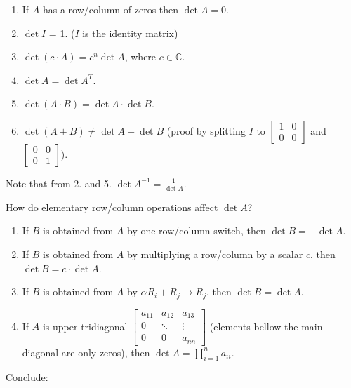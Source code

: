 \documentclass{article}
\newcommand{\nocomma}{}
\begin{document}
\begin{enumerate}
  \item If $A$ has a row/column of zeros then $\det A = 0$.
  
  \item $\det I$ = 1. ($I$ is the identity matrix)
  
  \item $\det (c \cdot A) = c^n \det A$, where $c \in \mathbb{C}$.
  
  \item $\det A = \det A^T$.
  
  \item $\det (A \cdot B) = \det A \cdot \det B$.
  
  \item $\det (A + B) \neq \det A + \det B$ (proof by splitting $I$ to
  $\left[\begin{array}{cc}
    1 & 0\\
    0 & 0
  \end{array}\right]$ and $\left[\begin{array}{cc}
    0 & 0\\
    0 & 1
  \end{array}\right]$).
\end{enumerate}
Note that from 2. and 5. $\det A^{- 1} = \frac{1}{\det A}$.

How do elementary row/column operations affect $\det A$?
\begin{enumerate}
  \item If $B$ is obtained from $A$ by one row/column switch, then $\det B = -
  \det A$.
  
  \item If $B$ is obtained from $A$ by multiplying a row/column by a scalar
  $c$, then $\det B = c \cdot \det A$.
  
  \item If $B$ is obtained from $A$ by $\alpha R_i + R_j \rightarrow R_j$,
  then $\det B = \det A$.
  
  \item If $A$ is upper-tridiagonal $\left[\begin{array}{ccc}
    a_{11} & a_{12} & a_{13}\\
    0 & \ddots & \vdots\\
    0 & 0 & a_{n \nocomma n}
  \end{array}\right]$ (elements bellow the main diagonal are only zeros), then
  $\det A = \prod_{i = 1}^n a_{i \nocomma i}$.
\end{enumerate}
{\underline{Conclude:}}
\end{document}
